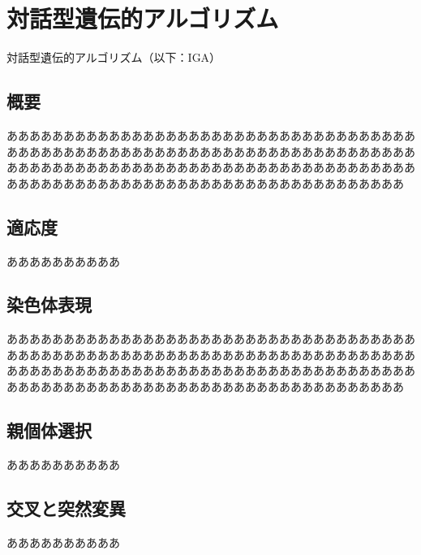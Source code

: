 \chapter{対話型遺伝的アルゴリズム}
対話型遺伝的アルゴリズム（以下：IGA）

\section{概要}
あああああああああああああああああああああああああああああああああああああああああああああああああああああああああああああああああああああああああああああああああああああああああああああああああああああああああああああああああああああああああああああああああああああああああああああああ

\section{適応度}
ああああああああああ

\section{染色体表現}
あああああああああああああああああああああああああああああああああああああああああああああああああああああああああああああああああああああああああああああああああああああああああああああああああああああああああああああああああああああああああああああああああああああああああああああああ

\section{親個体選択}
ああああああああああ

\section{交叉と突然変異}
ああああああああああ

